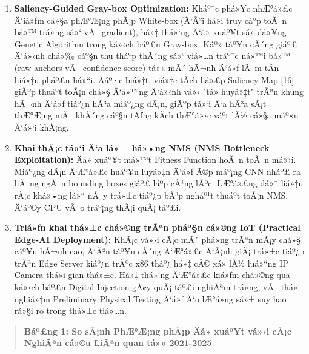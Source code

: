 \documentclass[]{article}
\begin{document}
\begin{enumerate}
\def\labelenumi{\arabic{enumi}.}
\item
  \textbf{Saliency-Guided Gray-box Optimization:} Kháº¯c phá»¥c nhÆ°á»£c Ä‘iá»ƒm
  cá»§a phÆ°Æ¡ng phÃ¡p White-box (Ä‘Ã²i há»i truy cáº­p toÃ n bá»™ trá»ng sá»‘ vÃ 
  gradient), há»‡ thá»‘ng Ä‘á» xuáº¥t sá»­ dá»¥ng Genetic Algorithm trong ká»‹ch báº£n
  Gray-box. Káº» táº¥n cÃ´ng giáº£ Ä‘á»‹nh chá»‰ cáº§n thu tháº­p thÃ´ng sá»‘
  viá»…n tráº¯c ná»™i bá»™ (raw anchors vÃ  confidence score) tá»« mÃ´ hÃ¬nh Ä‘á»ƒ lÃ m tÃ­n
  hiá»‡u pháº£n há»“i. Äáº·c biá»‡t, viá»‡c tÃ­ch há»£p Saliency Map {[}16{]} giÃºp
  thuáº­t toÃ¡n chá»§ Ä‘á»™ng Ä‘á»‹nh vá»‹ "tá»­ huyá»‡t" trÃªn khung hÃ¬nh Ä‘á»ƒ tiáº¿n hÃ³a
  miáº¿ng dÃ¡n, giÃºp tá»‘i Ä‘a hÃ³a sÃ¡t thÆ°Æ¡ng mÃ  khÃ´ng cáº§n tÄƒng kÃ­ch thÆ°á»›c váº­t
  lÃ½ cá»§a máº«u Ä‘á»‘i khÃ¡ng.
\item
  \textbf{Khai thÃ¡c tá»‘i Ä‘a lá»— há»•ng NMS (NMS Bottleneck Exploitation):} 
  Äá» xuáº¥t má»™t Fitness Function hoÃ n toÃ n má»›i. Miáº¿ng dÃ¡n Ä‘Æ°á»£c huáº¥n luyá»‡n Ä‘á»ƒ 
  Ã©p máº¡ng CNN nháº£ ra hÃ ng ngÃ n bounding boxes giáº£ láº­p cÃ¹ng lÃºc. LÆ°á»£ng dá»¯ 
  liá»‡u rÃ¡c khá»•ng lá»“ nÃ y trá»±c tiáº¿p bÃ³p ngháº¹t thuáº­t toÃ¡n NMS, Ä‘áº©y CPU vÃ o 
  tráº¡ng thÃ¡i quÃ¡ táº£i.
\item
  \textbf{Triá»ƒn khai thá»±c chá»©ng trÃªn pháº§n cá»©ng IoT (Practical
  Edge-AI Deployment):} KhÃ¡c vá»›i cÃ¡c mÃ´ phá»ng trÃªn mÃ¡y chá»§ cáº¥u hÃ¬nh
  cao, Ä‘Ã²n táº¥n cÃ´ng Ä‘Æ°á»£c Ä‘Ã¡nh giÃ¡ trá»±c tiáº¿p trÃªn Edge Server kiáº¿n trÃºc
  x86 tháº¿ há»‡ cÅ© xá»­ lÃ½ luá»“ng IP Camera thá»i gian thá»±c. Há»‡ thá»‘ng Ä‘Æ°á»£c kiá»ƒm
  chá»©ng qua ká»‹ch báº£n Digital Injection gÃ¢y quÃ¡ táº£i
  nghiÃªm trá»ng, vÃ  thá»­ nghiá»‡m Preliminary Physical
  Testing Ä‘á»ƒ Ä‘o lÆ°á»ng sá»± suy hao rá»§i ro trong thá»±c tiá»…n.
\end{enumerate}

\begin{quote}
\textbf{Báº£ng 1: So sÃ¡nh PhÆ°Æ¡ng phÃ¡p Äá» xuáº¥t vá»›i cÃ¡c NghiÃªn cá»©u LiÃªn quan
tá»« 2021-2025}
\end{quote}
\end{document}
